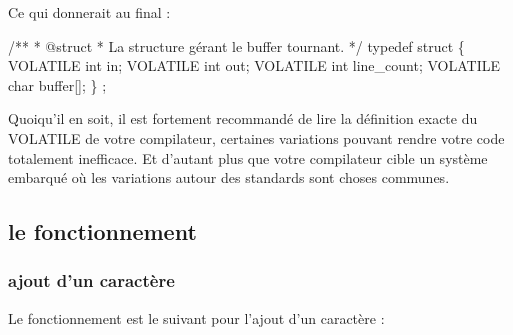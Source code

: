 \documentclass{scrartcl}%
\begin{document}
\nwendcode{}\nwdocspar
\noindent\makebox[\linewidth]{\rule{\paperwidth}{0.4pt}}
Ce qui donnerait au final :

\nwenddocs{}\endmoddef\nwstartdeflinemarkup{}\nwenddeflinemarkup
/**
 * @struct 
 * La structure gérant le buffer tournant.
 */
typedef struct \{
    VOLATILE int in;
    VOLATILE int out;
    VOLATILE int line_count;
    VOLATILE char buffer[];
\} ;

\eatline
{}\nwendcode{}\noindent\makebox[\linewidth]{\rule{\paperwidth}{0.4pt}}
Quoiqu'il en soit, il est fortement recommandé de lire la définition exacte du {\Tt{}VOLATILE\nwendquote} de votre compilateur, certaines variations pouvant rendre votre code totalement inefficace. Et d'autant plus que votre compilateur cible un système embarqué où les variations autour des standards sont choses communes.
\nwenddocs{}\nwdocspar
\noindent\makebox[\linewidth]{\rule{\paperwidth}{0.4pt}}


\subsection{le fonctionnement}
\subsubsection{ajout d'un caractère}
Le fonctionnement est le suivant pour l'ajout d'un caractère :
\end{document}
